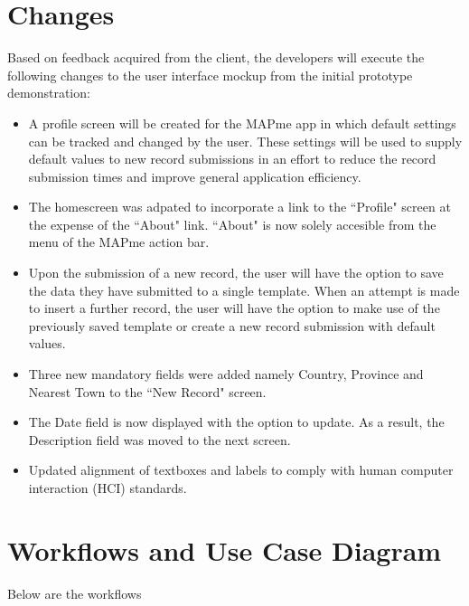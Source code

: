 \documentclass[12pt,a4paper,oneside]{report}
\begin{document}
\section{Changes}
	Based on feedback acquired from the client, the developers will execute the following changes to the user interface mockup from the initial prototype demonstration:
\begin{itemize}
	\item A profile screen will be created for the MAPme app in which default settings can be tracked and changed by the user.  These settings will be used to supply default values to new record submissions in an effort to reduce the record submission times and improve general application efficiency.
	\item The homescreen was adpated to incorporate a link to the  ``Profile" screen at the expense of the ``About" link. ``About" is now solely accesible from the menu of the MAPme action bar.
	\item Upon the submission of a new record, the user will have the option to save the data they have submitted to a single template.  When an attempt is made to insert a further record, the user will have the option to make use of the previously saved template or create a new record submission with default values.
	\item Three new mandatory fields were added namely Country, Province and Nearest Town to the ``New Record" screen.
	\item The Date field is now displayed with the option to update. As a result, the Description field was moved to the next screen.
	\item Updated alignment of textboxes and labels to comply with human computer interaction (HCI) standards.
\end{itemize}

\section{Workflows and Use Case Diagram}
Below are the workflows
\end{document}

